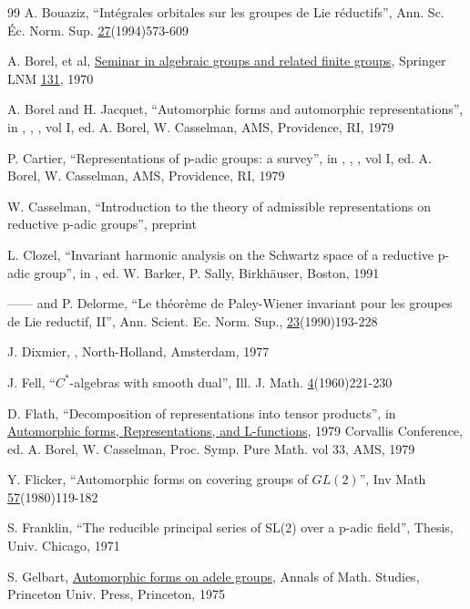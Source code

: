 \begin{thebibliography}{99}
 A. Bouaziz, ``Int\'egrales orbitales sur les groupes
de Lie r\'eductifs'', Ann. Sc. \'Ec. Norm. Sup.
\underline{27}(1994)573-609

 A. Borel, et al, \underline{Seminar in algebraic groups and
related finite groups}, Springer LNM \underline{131}, 1970

 A. Borel and H. Jacquet, ``Automorphic forms and automorphic
representations'', in  ,
,  ,
vol I, ed. A. Borel, W. Casselman, AMS, Providence, RI, 1979

 P. Cartier, ``Representations of p-adic groups: a survey'',
in  ,
,  ,
vol I, ed. A. Borel, W. Casselman, AMS, Providence, RI, 1979

 W. Casselman, ``Introduction to the theory of admissible
representations on reductive p-adic groups'', preprint

 L. Clozel, ``Invariant harmonic analysis 
on the Schwartz space of a
reductive p-adic group'', in   %
  , ed. W. Barker, P.
Sally, Birkh\"auser, Boston, 1991

 ------ and P. Delorme, ``Le th\'eor\`eme de Paley-Wiener
invariant pour les groupes de Lie reductif, II'',
Ann. Scient. Ec. Norm. Sup., \underline{23}(1990)193-228

 J. Dixmier, , North-Holland, 
Amsterdam, 1977

 J. Fell, ``$C^{*}$-algebras with smooth dual'', Ill. J. 
Math. \underline{4}(1960)221-230

 D. Flath, ``Decomposition of representations into tensor
products'', in
\underline{Automorphic forms, }
\underline{Representations, } \underline{and
L-functions}, 1979 Corvallis Conference, ed. A. Borel, W. Casselman,
Proc. Symp. Pure Math. vol 33, AMS, 1979

 Y. Flicker, ``Automorphic forms on covering groups of 
$GL(2)$'', Inv
Math \underline{57}(1980)119-182

 S. Franklin, ``The reducible principal series of
SL(2) over a p-adic
field'', Thesis, Univ. Chicago, 1971

 S. Gelbart, \underline{Automorphic forms on adele groups}, 
Annals of
Math. Studies, Princeton Univ. Press, Princeton, 1975


\end{thebibliography}
